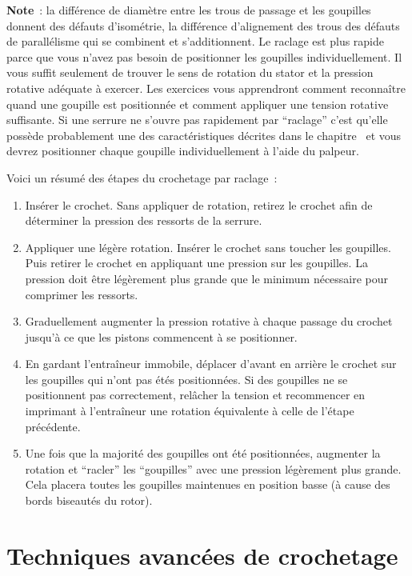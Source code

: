 \documentclass[a4paper,french,11pt,twoside]{report}
\begin{document}
\textbf{Note}~: la différence de diamètre entre les trous de passage et les goupilles donnent des défauts d'isométrie, la différence d'alignement des trous des défauts de parallélisme qui se combinent et s'additionnent. Le raclage est plus rapide parce que vous n'avez pas besoin de positionner les goupilles individuellement. Il vous suffit seulement de trouver le sens de rotation du stator et la pression rotative adéquate à exercer. Les exercices vous apprendront comment reconnaître quand une goupille est positionnée et comment appliquer une tension rotative suffisante. Si une serrure ne s'ouvre pas rapidement par \enquote{raclage} c'est qu'elle possède probablement une des caractéristiques décrites dans le chapitre~ et vous devrez positionner chaque goupille individuellement à l'aide du palpeur.

Voici un résumé des étapes du crochetage par raclage~:

\begin{enumerate}
    \item{Insérer le crochet. Sans appliquer de rotation, retirez le crochet afin de déterminer la pression des ressorts de la serrure.}
    \item{Appliquer une légère rotation. Insérer le crochet sans  toucher les goupilles. Puis retirer le crochet en appliquant une  pression sur les goupilles. La pression doit être légèrement plus grande  que le minimum nécessaire pour comprimer les ressorts.}
    \item{Graduellement augmenter la pression rotative à chaque passage du crochet jusqu'à ce que les pistons commencent à se positionner.}
    \item{En gardant l'entraîneur immobile, déplacer d'avant en  arrière le crochet sur les goupilles qui n'ont pas étés positionnées. Si  des goupilles ne se positionnent pas correctement, relâcher la tension  et recommencer en imprimant à l'entraîneur une rotation équivalente à  celle de l'étape précédente.}
    \item{Une fois que la majorité des goupilles ont été  positionnées, augmenter la rotation et \enquote{racler} les  \enquote{goupilles} avec une pression légèrement plus grande. Cela  placera toutes les goupilles maintenues en position basse (à cause des bords biseautés du rotor).}
\end{enumerate}

\chapter{\label{chap:techniques_avancees}Techniques avancées de crochetage}
\end{document}
